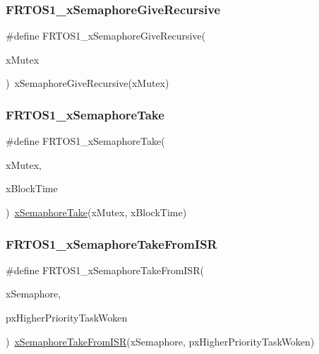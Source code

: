 \subsubsection{\texorpdfstring{F\+R\+T\+O\+S1\+\_\+x\+Semaphore\+Give\+Recursive}{FRTOS1\_xSemaphoreGiveRecursive}}
{\footnotesize\ttfamily \#define F\+R\+T\+O\+S1\+\_\+x\+Semaphore\+Give\+Recursive(\begin{DoxyParamCaption}\item[{}]{x\+Mutex }\end{DoxyParamCaption})~x\+Semaphore\+Give\+Recursive(x\+Mutex)}

\mbox{\label{group___f_r_t_o_s1__module_ga29d5d4c3ac382b41af7ead92376a5c2b}} 
\subsubsection{\texorpdfstring{F\+R\+T\+O\+S1\+\_\+x\+Semaphore\+Take}{FRTOS1\_xSemaphoreTake}}
{\footnotesize\ttfamily \#define F\+R\+T\+O\+S1\+\_\+x\+Semaphore\+Take(\begin{DoxyParamCaption}\item[{}]{x\+Mutex,  }\item[{}]{x\+Block\+Time }\end{DoxyParamCaption})~\hyperlink{semphr_8h_af116e436d2a5ae5bd72dbade2b5ea930}{x\+Semaphore\+Take}(x\+Mutex, x\+Block\+Time)}

\mbox{\label{group___f_r_t_o_s1__module_gacd326292cbd616697e16439191b295af}} 
\subsubsection{\texorpdfstring{F\+R\+T\+O\+S1\+\_\+x\+Semaphore\+Take\+From\+I\+SR}{FRTOS1\_xSemaphoreTakeFromISR}}
{\footnotesize\ttfamily \#define F\+R\+T\+O\+S1\+\_\+x\+Semaphore\+Take\+From\+I\+SR(\begin{DoxyParamCaption}\item[{}]{x\+Semaphore,  }\item[{}]{px\+Higher\+Priority\+Task\+Woken }\end{DoxyParamCaption})~\hyperlink{semphr_8h_a076419b58e072655686939016e7ca3c5}{x\+Semaphore\+Take\+From\+I\+SR}(x\+Semaphore, px\+Higher\+Priority\+Task\+Woken)}


